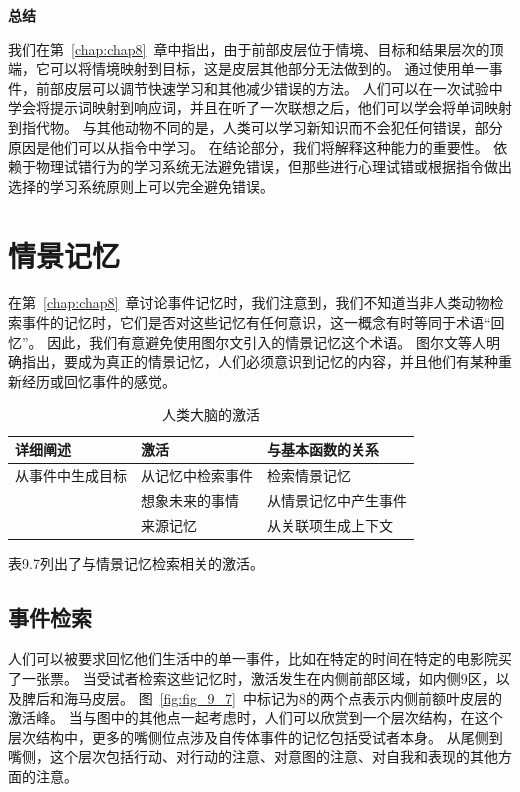 \textbf{总结}
\par
我们在第~\ref{chap:chap8}~章中指出，由于前部皮层位于情境、目标和结果层次的顶端，它可以将情境映射到目标，这是皮层其他部分无法做到的。
通过使用单一事件，前部皮层可以调节快速学习和其他减少错误的方法。
人们可以在一次试验中学会将提示词映射到响应词，并且在听了一次联想之后，他们可以学会将单词映射到指代物\cite{bloom2002children}。
与其他动物不同的是，人类可以学习新知识而不会犯任何错误，部分原因是他们可以从指令中学习。
在结论部分，我们将解释这种能力的重要性。
依赖于物理试错行为的学习系统无法避免错误，但那些进行心理试错或根据指令做出选择的学习系统原则上可以完全避免错误。



\section{情景记忆}

在第~\ref{chap:chap8}~章讨论事件记忆时，我们注意到，我们不知道当非人类动物检索事件的记忆时，它们是否对这些记忆有任何意识，这一概念有时等同于术语“回忆”。
因此，我们有意避免使用图尔文\cite{tulving1983elements}引入的情景记忆这个术语。
图尔文等人明确指出，要成为真正的情景记忆，人们必须意识到记忆的内容，并且他们有某种重新经历或回忆事件的感觉。
\par

\begin{table}[htbp] 
	\newcommand{\tabincell}[2]{\begin{tabular}{@{}#1@{}}#2\end{tabular}} %
	\centering
	\caption{人类大脑的激活\label{tab:9_7}}
	\renewcommand\arraystretch{1.5}	%
	\begin{tabular}{lll}
		\toprule
		详细阐述 & 激活 & 与基本函数的关系\\
		\midrule
		从事件中生成目标 & 从记忆中检索事件 & 检索情景记忆  \\
		& 想象未来的事情 & 从情景记忆中产生事件 \\
		& 来源记忆 & 从关联项生成上下文 \\
		\bottomrule
		
	\end{tabular}%
\end{table}%


表9.7列出了与情景记忆检索相关的激活。



\subsection{事件检索}
人们可以被要求回忆他们生活中的单一事件，比如在特定的时间在特定的电影院买了一张票。
当受试者检索这些记忆时，激活发生在内侧前部区域，如内侧9区，以及脾后和海马皮层\cite{hassabis2007patients,summerfield2009decision}。
图~\ref{fig:fig_9_7}~中标记为8的两个点表示内侧前额叶皮层的激活峰。
当与图中的其他点一起考虑时，人们可以欣赏到一个层次结构，在这个层次结构中，更多的嘴侧位点涉及自传体事件的记忆包括受试者本身。
从尾侧到嘴侧，这个层次包括行动、对行动的注意、对意图的注意、对自我和表现的其他方面的注意。
\par


